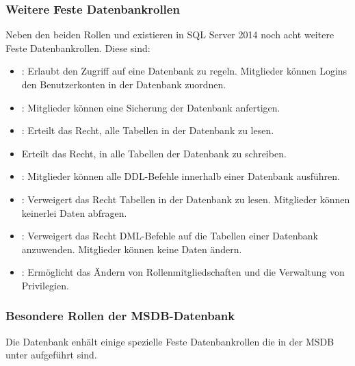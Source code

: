         \subsubsection{Weitere Feste Datenbankrollen}
          Neben den beiden Rollen  und 
          existieren in SQL Server 2014 noch acht weitere Feste Datenbankrollen.
          Diese sind:
          \begin{itemize}
            \item {}: Erlaubt den Zugriff auf
            eine Datenbank zu regeln. Mitglieder können Logins
            den Benutzerkonten in der Datenbank zuordnen.
            \item {}: Mitglieder können eine
            Sicherung der Datenbank anfertigen.
            \item {}: Erteilt das Recht, alle Tabellen in
            der Datenbank zu lesen.
            \item {} Erteilt das Recht, in alle
            Tabellen der Datenbank zu schreiben.
            \item {}: Mitglieder können alle DDL-Befehle
            innerhalb einer Datenbank ausführen.
            \item {}: Verweigert das Recht Tabellen
            in der Datenbank zu lesen. Mitglieder können keinerlei Daten
            abfragen.
            \item {}: Verweigert das Recht
            DML-Befehle auf die Tabellen einer Datenbank anzuwenden. Mitglieder
            können keine Daten ändern.
            \item {}: Ermöglicht das Ändern von
            Rollenmitgliedschaften und die Verwaltung von Privilegien.
          \end{itemize}
          \begin{literaturinternet}
            \item \cite{ms189121}
            \item \cite{ms189612}
          \end{literaturinternet}
        \subsubsection{Besondere Rollen der MSDB-Datenbank}
          Die Datenbank  enhält einige spezielle Feste
          Datenbankrollen die in der MSDB unter \parencite{ms189121} aufgeführt
          sind.
